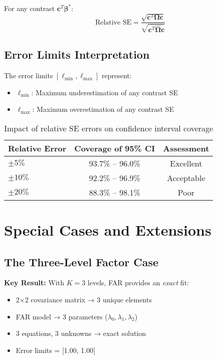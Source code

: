 \documentclass[11pt]{article}
\begin{document}
For any contrast $\mathbf{c}^T\boldsymbol{\beta}^*$:
\begin{equation}
    \text{Relative SE} = \frac{\sqrt{\mathbf{c}^T\boldsymbol{\Omega}\mathbf{c}}}{\sqrt{\mathbf{c}^T\hat{\boldsymbol{\Omega}}\mathbf{c}}}
\end{equation}

\subsection{Error Limits Interpretation}

The error limits $[\ell_{\min}, \ell_{\max}]$ represent:
\begin{itemize}
    \item $\ell_{\min}$: Maximum underestimation of any contrast SE
    \item $\ell_{\max}$: Maximum overestimation of any contrast SE
\end{itemize}

\begin{table}[h]
\centering
\begin{tabular}{@{}lcc@{}}
\toprule
Relative Error & Coverage of 95\% CI & Assessment \\
\midrule
$\pm 5\%$ & 93.7\% -- 96.0\% & Excellent \\
$\pm 10\%$ & 92.2\% -- 96.9\% & Acceptable \\
$\pm 20\%$ & 88.3\% -- 98.1\% & Poor \\
\bottomrule
\end{tabular}
\caption{Impact of relative SE errors on confidence interval coverage}
\end{table}

\section{Special Cases and Extensions}

\subsection{The Three-Level Factor Case}

\textbf{Key Result:} With $K = 3$ levels, FAR provides an \textit{exact} fit:

\begin{itemize}
    \item 2×2 covariance matrix → 3 unique elements
    \item FAR model → 3 parameters ($\lambda_0, \lambda_1, \lambda_2$)
    \item 3 equations, 3 unknowns → exact solution
    \item Error limits = [1.00, 1.00]
\end{itemize}
\end{document}

